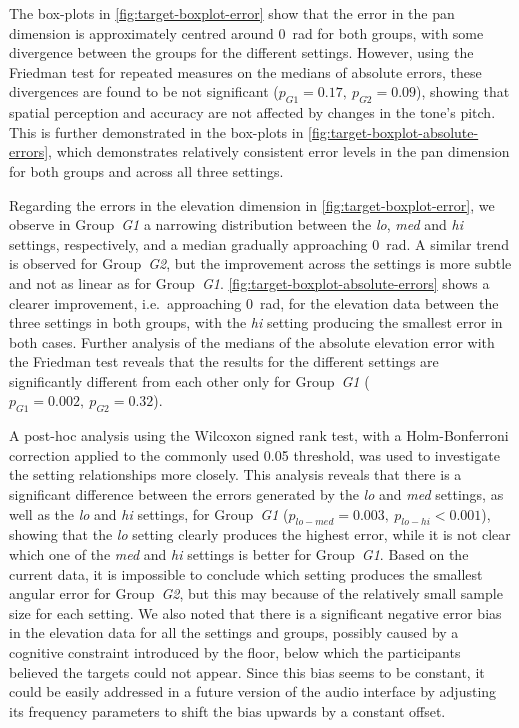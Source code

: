 \documentclass[acmsmall]{acmart}
\begin{document}
The box-plots in \cref{fig:target-boxplot-error} show that the error in the pan dimension is approximately centred around \SI{0}{\radian} for both groups, with some divergence between the groups for the different settings.
However, using the Friedman test for repeated measures on the medians of absolute errors, these divergences are found to be not significant ($p_{G1} = 0.17,~p_{G2} = 0.09$), showing that spatial perception and accuracy are not affected by changes in the tone's pitch.
This is further demonstrated in the box-plots in \cref{fig:target-boxplot-absolute-errors}, which demonstrates relatively consistent error levels in the pan dimension for both groups and across all three settings. 

Regarding the errors in the elevation dimension in \cref{fig:target-boxplot-error}, we observe in Group~\textit{G1} a narrowing distribution between the \textit{lo}, \textit{med} and \textit{hi} settings, respectively, and a median gradually approaching \SI{0}{\radian}.
A similar trend is observed for Group~\textit{G2}, but the improvement across the settings is more subtle and not as linear as for Group~\textit{G1}.
\cref{fig:target-boxplot-absolute-errors} shows a clearer improvement, i.e.\ approaching \SI{0}{\radian}, for the elevation data between the three settings in both groups, with the \textit{hi} setting producing the smallest error in both cases.
Further analysis of the medians of the absolute elevation error with the Friedman test reveals that the results for the different settings are significantly different from each other only for Group~\textit{G1} ($p_{G1} = 0.002,~p_{G2} = 0.32$).

A post-hoc analysis using the Wilcoxon signed rank test, with a Holm-Bonferroni correction applied to the commonly used 0.05 threshold, was used to investigate the setting relationships more closely. 
This analysis reveals that there is a significant difference between the errors generated by the \textit{lo} and \textit{med} settings, as well as the \textit{lo} and \textit{hi} settings, for Group~\textit{G1} ($p_{lo-med} = 0.003,~p_{lo-hi} < 0.001$), showing that the \textit{lo} setting clearly produces the highest error, while it is not clear which one of the \textit{med} and \textit{hi} settings is better for Group~\textit{G1}. 
Based on the current data, it is impossible to conclude which setting produces the smallest angular error for Group~\textit{G2}, but this may because of the relatively small sample size for each setting. 
We also noted that there is a significant negative error bias in the elevation data for all the settings and groups, possibly caused by a cognitive constraint introduced by the floor, below which the participants believed the targets could not appear.
Since this bias seems to be constant, it could be easily addressed in a future version of the audio interface by adjusting its frequency parameters to shift the bias upwards by a constant offset. 
\end{document}
